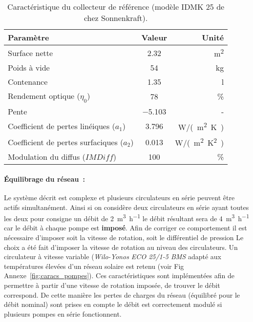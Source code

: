 \begin{table}
\centering
\caption{Caractéristique du collecteur de référence (modèle IDMK 25 de chez Sonnenkraft).}
\label{tab:idmk_specs}
\begin{tabular}{lcr}
    \toprule
    Paramètre                                   & Valeur         & Unité                 \\
    \midrule
    Surface nette                               & \num{2.32}           & \si{m^{2}}            \\
    Poids à vide                                & \num{54}             & \si{kg}               \\
    Contenance                                  & \num{1.35}           & \si{l}                \\
    Rendement optique ($\eta_{0}$)              & \num{78}             & \si{\%}               \\
    Pente                                       & \num{-5.103}         & -                     \\
    Coefficient de pertes linéiques ($a_{1}$)   & \num{3.796}          & \si{W/(m^{2}.K)}      \\
    Coefficient de pertes surfaciques ($a_{2}$) & \num{0.013}          & \si{W/(m^{2}.K^{2})}  \\
    Modulation du diffus ($IMDiff$)             & \num{100}            & \si{\%}               \\
    \bottomrule
\end{tabular}
\end{table}

\paragraph{Équilibrage du réseau~:} %
\label{par:equilibrage_du_reseau}
Le système décrit est complexe et plusieurs circulateurs en série peuvent être actifs
simultanément. Ainsi si on considère deux circulateurs en série ayant toutes les deux pour
consigne un débit de \SI[per- mode=symbol]{2}{\meter\cubed\per\hour} le débit résultant
sera de \SI[per-mode=symbol]{4}{\meter\cubed\per\hour} car le débit à chaque pompe est
\textbf{imposé}. Afin de corriger ce comportement il est nécessaire d’imposer soit la
vitesse de rotation, soit le différentiel de pression Le choix a été fait d’imposer la
vitesse de rotation au niveau des circulateurs. Un circulateur à vitesse variable (\emph
{Wilo-Yonos ECO 25/1-5 BMS} adapté aux températures élevées d’un réseau solaire est
retenu (voir Fig Annexe~\ref{fig:caracs_pompes}).
Ces caractéristiques sont implémentées afin de permettre à partir d’une vitesse de
rotation imposée, de trouver le débit correspond. De cette manière les pertes de charges
du réseau (équilibré pour le débit nominal) sont prises en compte le débit est
correctement modulé si plusieurs pompes en série fonctionnent.


